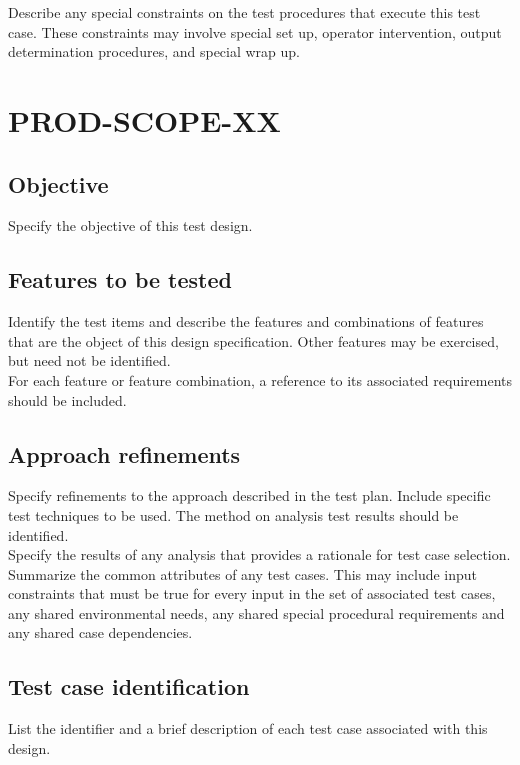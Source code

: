 \documentclass[DM,lsstdraft,STS,toc]{lsstdoc}
\def\product{PROD}
\begin{document}
Describe any special constraints on the test procedures that execute this test case. These constraints may involve special set
up, operator intervention, output determination procedures, and special wrap up.


\section{\product-SCOPE-XX \label{sect:designid}}

\subsection{Objective \label{sect:designobj}}
Specify the objective of this test design.

\subsection{Features to be tested \label{sect:totest}}
Identify the test items and describe the features and combinations of features that are the object of this design
specification. Other features may be exercised, but need not be identified.\\
For each feature or feature combination, a reference to its associated requirements should be included.

\subsection{Approach refinements \label{sect:approach}}
Specify refinements to the approach described in the test plan. Include specific test techniques to be used.
The method on analysis test results should be identified.\\
Specify the results of any analysis that provides a rationale for test case selection.\\
Summarize the common attributes of any test cases. This may include input constraints that must be true for every input
in the set of associated test cases, any shared environmental needs, any shared special procedural requirements and any
shared case dependencies.

\subsection{Test case identification \label{sect:testcaselist}}
List the identifier and a brief description of each test case associated with this design.
\end{document}
